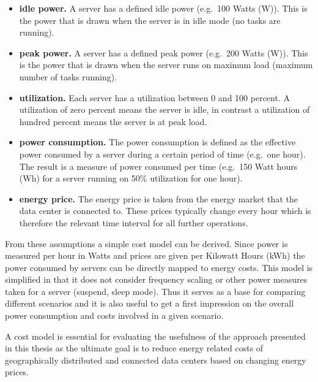 \begin{itemize}

\item \textbf{idle power.} A server has a defined idle power (e.g.~100 Watts (W)). This is the power that is drawn when the server is in idle mode (no tasks are running). 

\item \textbf{peak power.} A server has a defined peak power (e.g.~200 Watts (W)). This is the power that is drawn when the server runs on maximum load (maximum number of tasks running). 

\item \textbf{utilization.} Each server has a utilization between 0 and 100 percent. A utilization of zero percent means the server is idle, in contrast a utilization of hundred percent means the server is at peak load. 

\item \textbf{power consumption.} The power consumption is defined as the effective power consumed by a server during a certain period of time (e.g.~one hour). The result is a measure of power consumed per time (e.g.~150 Watt hours (Wh) for a server running on 50\% utilization for one hour). %

\item \textbf{energy price.} The energy price is taken from the energy market that the data center is connected to. These prices typically change every hour which is therefore the relevant time interval for all further operations. 

\end{itemize}

From these assumptions a simple cost model can be derived. Since power is measured per hour in Watts and prices are given per Kilowatt Hours (kWh) the power consumed by servers can be directly mapped to energy costs. This model is simplified in that it does not consider frequency scaling or other power measures taken for a server (suspend, sleep mode). Thus it serves as a base for comparing different scenarios and it is also useful to get a first impression on the overall power consumption and costs involved in a given scenario. 

A cost model is essential for evaluating the usefulness of the approach presented in this thesis as the ultimate goal is to reduce energy related costs of geographically distributed and connected data centers based on changing energy prices. 



